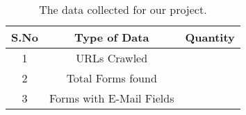 \begin{table}[!htbp]
	\centering
	\begin{tabular}{|c|c|c|}
		\hline
		\multicolumn{1}{|c|}{\textbf{S.No}} &
		\multicolumn{1}{c|}{\textbf{Type of Data}} &
		\multicolumn{1}{c|}{\textbf{Quantity}}\\
		\hline
		1 & URLs Crawled & \urls \\
		\hline
		2 & Total Forms found & \forms \\
		\hline
		3 & Forms with E-Mail Fields & \emailforms \\
		\hline
	\end{tabular}
	\caption[]{The data collected for our project.}
	\label{tab:data}
\end{table}